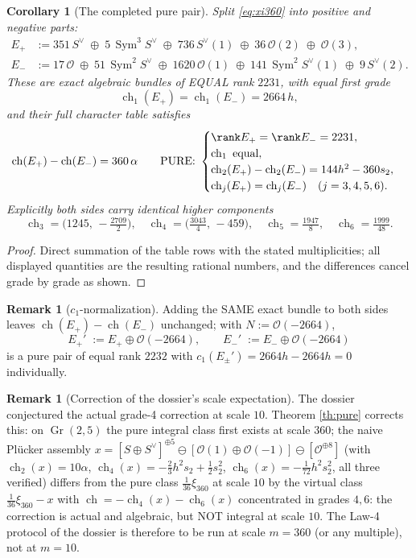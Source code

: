 \documentclass[11pt]{article}
\newtheorem{corollary}[theorem]{Corollary}
\theoremstyle{definition}
\newtheorem{remark}[theorem]{Remark}
\newcommand{\ch}{\operatorname{ch}}
\newcommand{\Gr}{\operatorname{Gr}}
\newcommand{\Sym}{\operatorname{Sym}}
\newcommand{\Oo}{\mathcal O}
\begin{document}
\begin{corollary}[The completed pure pair]
\label{cor:pair}
Split \eqref{eq:xi360} into positive and negative parts:
\begin{align*}
E_+&:=351\,S^\vee\;\oplus\;5\,\Sym^3S^\vee\;\oplus\;736\,S^\vee(1)
\;\oplus\;36\,\Oo(2)\;\oplus\;\Oo(3),\\
E_-&:=17\,\Oo\;\oplus\;51\,\Sym^2S^\vee\;\oplus\;1620\,\Oo(1)
\;\oplus\;141\,\Sym^2S^\vee(1)\;\oplus\;9\,S^\vee(2).
\end{align*}
These are exact algebraic bundles of EQUAL rank $2231$, with equal
first grade
\[
\ch_1(E_+)=\ch_1(E_-)=2664\,h,
\]
and their full character table satisfies
\[
\ch(E_+)-\ch(E_-)=360\,\alpha
\qquad\text{PURE: }
\begin{cases}
\rank E_+=\rank E_-=2231,\\
\ch_1\text{ equal},\\
\ch_2(E_+)-\ch_2(E_-)=144h^2-360s_2,\\
\ch_j(E_+)=\ch_j(E_-)\quad(j=3,4,5,6).
\end{cases}
\]
Explicitly both sides carry identical higher components
\[
\ch_3=\bigl(1245,\,-\tfrac{2709}2\bigr),\quad
\ch_4=\bigl(\tfrac{3043}4,\,-459\bigr),\quad
\ch_5=\tfrac{1947}8,\quad
\ch_6=\tfrac{1999}{48}.
\]
\end{corollary}

\begin{proof}
Direct summation of the table rows with the stated multiplicities;
all displayed quantities are the resulting rational numbers, and the
differences cancel grade by grade as shown.
\end{proof}

\begin{remark}[$c_1$-normalization]
\label{rem:c1}
Adding the SAME exact bundle to both sides leaves
$\ch(E_+)-\ch(E_-)$ unchanged; with $N:=\Oo(-2664)$,
\[
E_+'\;:=E_+\oplus\Oo(-2664),\qquad
E_-'\;:=E_-\oplus\Oo(-2664)
\]
is a pure pair of equal rank $2232$ with
$c_1(E_\pm')=2664h-2664h=0$ individually.
\end{remark}

\begin{remark}[Correction of the dossier's scale expectation]
\label{rem:scale}
The dossier conjectured the actual grade-4 correction at scale $10$.
Theorem \ref{th:pure} corrects this: on $\Gr(2,5)$ the pure integral
class first exists at scale $360$; the naive Pl\"ucker assembly
$x=[S\oplus S^\vee]^{\oplus5}\ominus[\Oo(1)\oplus\Oo(-1)]\ominus
[\Oo^{\oplus8}]$ (with $\ch_2(x)=10\alpha$,
$\ch_4(x)=-\tfrac23h^2s_2+\tfrac12s_2^2$,
$\ch_6(x)=-\tfrac1{72}h^2s_2^2$, all three verified) differs from the
pure class $\tfrac1{36}\xi_{360}$ at scale $10$ by the virtual class
$\tfrac1{36}\xi_{360}-x$ with
$\ch=-\ch_4(x)-\ch_6(x)$ concentrated in grades $4,6$: the correction
is actual and algebraic, but NOT integral at scale $10$. The Law-4
protocol of the dossier is therefore to be run at scale $m=360$ (or
any multiple), not at $m=10$.
\end{remark}
\end{document}
